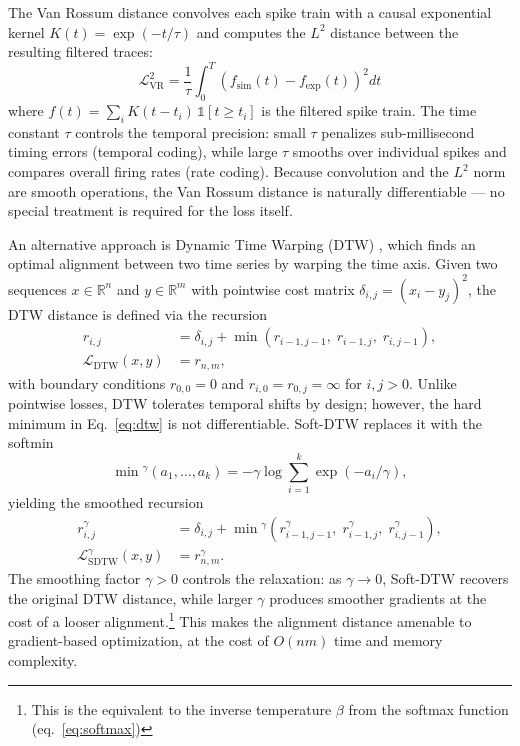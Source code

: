 The Van Rossum distance \cite{Rossum2001} convolves each spike train with a causal exponential kernel $K(t) = \exp(-t/\tau)$ and computes the $L^2$ distance between the resulting filtered traces:
\begin{equation}\label{eq:van-rossum}
    \mathcal{L}_{\text{VR}}^2 = \frac{1}{\tau} \int_0^T \left( f_{\text{sim}}(t) - f_{\text{exp}}(t) \right)^2 dt
\end{equation}
where $f(t) = \sum_i K(t - t_i)\,\mathds{1}[t\ge t_i]$ is the filtered spike train.
The time constant $\tau$ controls the temporal precision: small $\tau$ penalizes sub-millisecond timing errors (temporal coding),
while large $\tau$ smooths over individual spikes and compares overall firing rates (rate coding).
Because convolution and the $L^2$ norm are smooth operations, the Van Rossum distance is naturally differentiable --- no special treatment is required for the loss itself.

An alternative approach is Dynamic Time Warping (DTW) \cite{Sakoe1978}, which finds an optimal alignment between two time series by warping the time axis.
Given two sequences $x \in \mathbb{R}^n$ and $y \in \mathbb{R}^m$ with pointwise cost matrix $\delta_{i,j} = (x_i - y_j)^2$, the DTW distance is defined via the recursion
\begin{align}\label{eq:dtw}
    r_{i,j} &= \delta_{i,j} + \min\!\left( r_{i-1,j-1},\; r_{i-1,j},\; r_{i,j-1} \right),\nonumber\\
    \mathcal{L}_{\text{DTW}}(x, y) &= r_{n,m},
\end{align}
with boundary conditions $r_{0,0} = 0$ and $r_{i,0} = r_{0,j} = \infty$ for $i, j > 0$.
Unlike pointwise losses, DTW tolerates temporal shifts by design; however, the hard minimum in Eq.~\eqref{eq:dtw} is not differentiable.
Soft-DTW \cite{Blondel2018} replaces it with the softmin
\begin{equation}\label{eq:softmin}
    \min{}^{\gamma}(a_1, \dots, a_k) = -\gamma \log \sum_{i=1}^{k} \exp(-a_i / \gamma),
\end{equation}
yielding the smoothed recursion
\begin{align}\label{eq:soft-dtw}
    r_{i,j}^{\gamma} &= \delta_{i,j} + \min{}^{\gamma}\!\left( r_{i-1,j-1}^{\gamma},\; r_{i-1,j}^{\gamma},\; r_{i,j-1}^{\gamma} \right),\nonumber\\
    \mathcal{L}_{\text{SDTW}}^{\gamma}(x, y) &= r_{n,m}^{\gamma}.
\end{align}
The smoothing factor $\gamma > 0$ controls the relaxation:
as $\gamma \to 0$, Soft-DTW recovers the original DTW distance, while larger $\gamma$ produces smoother gradients at the cost of a looser alignment.\footnote{This is the equivalent to the inverse temperature $\beta$ from the softmax function (eq.~\ref{eq:softmax})}
This makes the alignment distance amenable to gradient-based optimization, at the cost of $O(nm)$ time and memory complexity.

